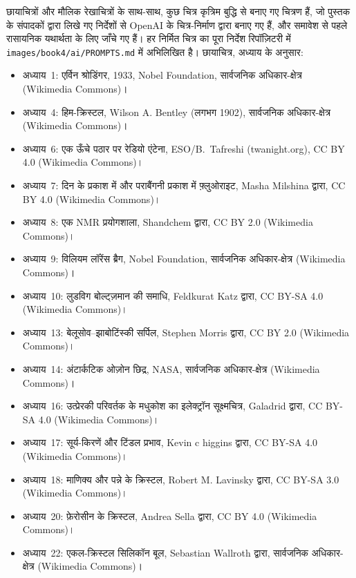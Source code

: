 \bigskip
छायाचित्रों और मौलिक रेखाचित्रों के साथ-साथ, कुछ चित्र
कृत्रिम बुद्धि से बनाए गए चित्रण हैं, जो पुस्तक के संपादकों द्वारा लिखे गए निर्देशों से
OpenAI के चित्र-निर्माण द्वारा बनाए गए हैं, और समावेश से पहले रासायनिक
यथार्थता के लिए जाँचे गए हैं। हर निर्मित चित्र का पूरा निर्देश
रिपॉज़िटरी में \texttt{images/book4/ai/PROMPTS.md} में अभिलिखित है।
\bigskip
\noindent छायाचित्र, अध्याय के अनुसार:
\begin{itemize}\small
  \item अध्याय~1: एर्विन श्रोडिंगर, 1933, Nobel Foundation, सार्वजनिक अधिकार-क्षेत्र
        (Wikimedia Commons)।
  \item अध्याय~4: हिम-क्रिस्टल, Wilson A. Bentley (लगभग 1902), सार्वजनिक अधिकार-क्षेत्र
        (Wikimedia Commons)।
  \item अध्याय~6: एक ऊँचे पठार पर रेडियो एंटेना, ESO/B.~Tafreshi
        (twanight.org), CC BY 4.0 (Wikimedia Commons)।
  \item अध्याय~7: दिन के प्रकाश में और पराबैंगनी प्रकाश में फ़्लुओराइट, Masha
        Milshina द्वारा, CC BY 4.0 (Wikimedia Commons)।
  \item अध्याय~8: एक NMR प्रयोगशाला, Shandchem द्वारा, CC BY 2.0 (Wikimedia
        Commons)।
  \item अध्याय~9: विलियम लॉरेंस ब्रैग, Nobel Foundation, सार्वजनिक अधिकार-क्षेत्र
        (Wikimedia Commons)।
  \item अध्याय~10: लुडविग बोल्ट्ज़मान की समाधि, Feldkurat Katz द्वारा,
        CC BY-SA 4.0 (Wikimedia Commons)।
  \item अध्याय~13: बेलूसोव--झाबोटिंस्की सर्पिल, Stephen Morris द्वारा, CC BY 2.0
        (Wikimedia Commons)।
  \item अध्याय~14: अंटार्कटिक ओज़ोन छिद्र, NASA, सार्वजनिक अधिकार-क्षेत्र (Wikimedia
        Commons)।
  \item अध्याय~16: उत्प्रेरकी परिवर्तक के मधुकोश का इलेक्ट्रॉन सूक्ष्मचित्र,
        Galadrid द्वारा, CC BY-SA 4.0 (Wikimedia Commons)।
  \item अध्याय~17: सूर्य-किरणें और टिंडल प्रभाव, Kevin c higgins द्वारा, CC BY-SA 4.0
        (Wikimedia Commons)।
  \item अध्याय~18: माणिक्य और पन्ने के क्रिस्टल, Robert M. Lavinsky द्वारा, CC BY-SA 3.0
        (Wikimedia Commons)।
  \item अध्याय~20: फ़ेरोसीन के क्रिस्टल, Andrea Sella द्वारा, CC BY 4.0 (Wikimedia
        Commons)।
  \item अध्याय~22: एकल-क्रिस्टल सिलिकॉन बूल, Sebastian Wallroth द्वारा, सार्वजनिक
        अधिकार-क्षेत्र (Wikimedia Commons)।

\end{itemize}
